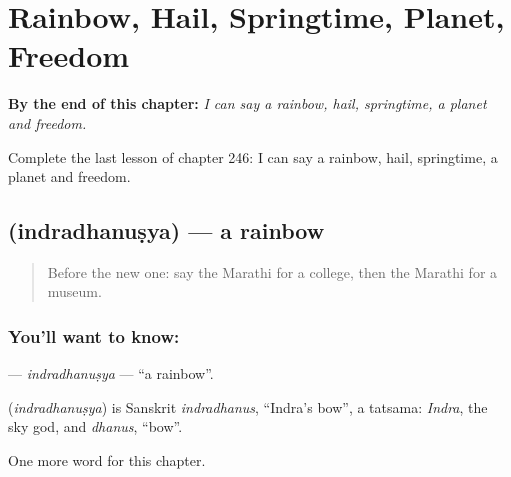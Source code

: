 
\chapter{Rainbow, Hail, Springtime, Planet, Freedom}
\label{ch:mr-rainbow-hail-springtime-planet-freedom}

\begin{chapteropening}
\textbf{By the end of this chapter:} \emph{I can say a rainbow, hail, springtime, a planet and freedom.}

Complete the last lesson of chapter 246: I can say a rainbow, hail, springtime, a planet and freedom.
\end{chapteropening}

\section[\texorpdfstring{\mr{इंद्रधनुष्य} (indradhanuṣya)}{इंद्रधनुष्य (indradhanuṣya)}]{ (indradhanuṣya) — a rainbow}

\label{lesson:MR-C246-indradhanusya}



\begin{quote}
Before the new one: say the Marathi for a college, then the Marathi for a museum.
\end{quote}

\subsection*{You'll want to know: }
\textbf{} — \emph{indradhanuṣya} — \textquotedblleft{}a rainbow\textquotedblright{}.

\begin{cousinweb}
\textbf{} (\emph{indradhanuṣya}) is Sanskrit \emph{indradhanus}, \textquotedblleft{}Indra's bow\textquotedblright{}, a tatsama: \emph{Indra}, the sky god, and \emph{dhanus}, \textquotedblleft{}bow\textquotedblright{}.
\end{cousinweb}

\begin{grammarlens}[title={What you've built}]
One more word for this chapter.
\end{grammarlens}


